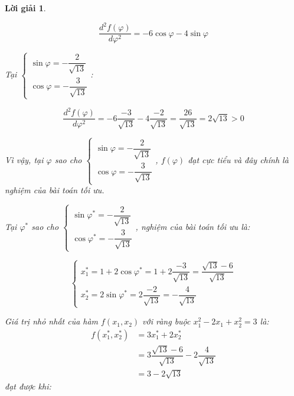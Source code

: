 \documentclass[14pt, a4paper]{article}
\theoremstyle{sltheorem}
\theoremstyle{soltheorem}
\newtheorem*{loigiai}{Lời giải}
\begin{document}
\begin{loigiai}
\begin{itemize}
            \begin{equation*}
                \dfrac{d^2 f(\varphi)}{d \varphi^2} = - 6 \cos \varphi - 4 \sin \varphi
            \end{equation*}

            Tại $\begin{cases} \sin \varphi = -\dfrac{2}{\sqrt{13}} \\ \cos \varphi = -\dfrac{3}{\sqrt{13}} \end{cases}$:

            \begin{equation*}
                \dfrac{d^2 f(\varphi)}{d \varphi^2} = -6 \dfrac{-3}{\sqrt{13}} - 4 \dfrac{-2}{\sqrt{13}} = \dfrac{26}{\sqrt{13}}=2\sqrt{13} > 0
            \end{equation*}

            Vì vậy, tại $\varphi$ sao cho $\begin{cases} \sin \varphi = -\dfrac{2}{\sqrt{13}} \\ \cos \varphi = -\dfrac{3}{\sqrt{13}} \end{cases}$, $f(\varphi)$ đạt cực tiểu và đây chính là nghiệm của bài toán tối ưu.

            Tại $\varphi^*$ sao cho $\begin{cases} \sin \varphi^* = -\dfrac{2}{\sqrt{13}} \\ \cos \varphi^* = -\dfrac{3}{\sqrt{13}} \end{cases}$, nghiệm của bài toán tối ưu là:

            \begin{equation*}
                \begin{cases}
                    x_1^* = 1 + 2 \cos \varphi^* = 1 + 2 \dfrac{-3}{\sqrt{13}} = \dfrac{\sqrt{13} - 6}{\sqrt{13}} \\
                    x_2^* = 2 \sin \varphi^* = 2 \dfrac{-2}{\sqrt{13}} = -\dfrac{4}{\sqrt{13}}
                \end{cases}
            \end{equation*}
        \end{itemize}
        Giá trị nhỏ nhất của hàm $f(x_1, x_2)$ với ràng buộc $x_1^2 - 2x_1 + x_2^2 =3$ là:
            \begin{equation*}
                \begin{aligned}
                f(x_1^*, x_2^*)&=3x_1^* + 2x_2^* \\&= 3 \dfrac{\sqrt{13}-6}{\sqrt{13}} - 2 \dfrac{4}{\sqrt{13}}\\
                &= 3 - 2\sqrt{13}
                \end{aligned}
            \end{equation*}
        đạt được khi:


\end{loigiai}
\end{document}
